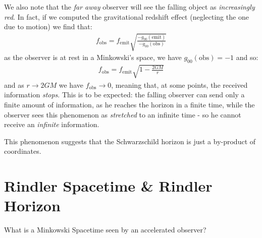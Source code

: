 \documentclass[../template.tex]{subfiles}
\begin{document}
We also note that the \textit{far away} observer will see the falling object as \textit{increasingly red}. In fact, if we computed the gravitational redshift effect (neglecting the one due to motion) we find that:
\begin{align*}
    f_{\mathrm{obs} } = f_{\mathrm{emit} } \sqrt{\frac{-g_{00}(\mathrm{emit} )}{-g_{00}(\mathrm{obs} )} }
\end{align*}  
as the observer is at rest in a Minkowski's space, we have $g_{00} (\mathrm{obs} ) = -1$ and so:
\begin{align*}
    f_{\mathrm{obs} } = f_{\mathrm{emit} } \sqrt{1-\frac{2GM}{r} }
\end{align*}
and as $r \to 2GM $ we have $f_{\mathrm{obs} } \to 0$, meaning that, at some points, the received information \textit{stops}. This is to be expected: the falling observer can send only a finite amount of information, as he reaches the horizon in a finite time, while the observer sees this phenomenon as \textit{stretched} to an infinite time - so he cannot receive an \textit{infinite} information. 

This phenomenon suggests that the Schwarzschild horizon is just a by-product of coordinates.

\section{Rindler Spacetime \& Rindler Horizon}
What is a Minkowski Spacetime seen by an accelerated observer?
\end{document}
